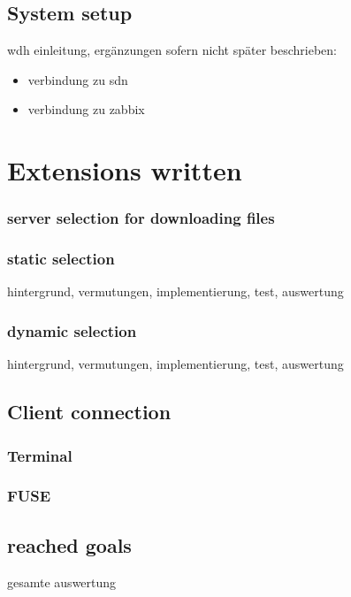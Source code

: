 \subsection{System setup}

wdh einleitung, ergänzungen sofern nicht später beschrieben:

\begin{itemize}
\item verbindung zu sdn
\item verbindung zu zabbix
\end{itemize}

\section{Extensions written}

\subsubsection{server selection for downloading files}

\subsubsection{static selection}

hintergrund, vermutungen, implementierung, test, auswertung

\subsubsection{dynamic selection}

hintergrund, vermutungen, implementierung, test, auswertung

\subsection{Client connection}
\subsubsection{Terminal}
\subsubsection{FUSE}

\subsection{reached goals}
gesamte auswertung





